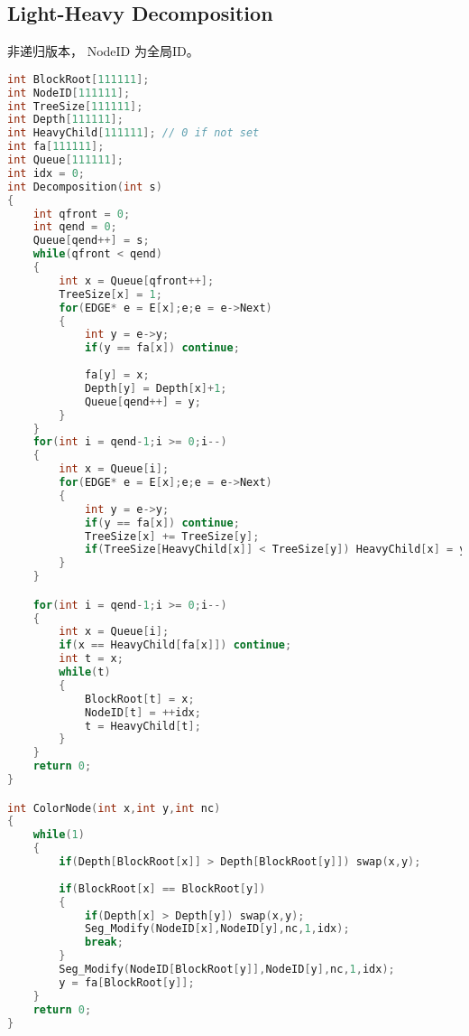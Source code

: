 \subsection{Light-Heavy Decomposition}
 非递归版本， NodeID 为全局ID。
\begin{lstlisting}[language=C++]
int BlockRoot[111111];
int NodeID[111111];
int TreeSize[111111];
int Depth[111111];
int HeavyChild[111111]; // 0 if not set
int fa[111111];
int Queue[111111];
int idx = 0;
int Decomposition(int s)
{
	int qfront = 0;
	int qend = 0;
	Queue[qend++] = s;
	while(qfront < qend)
	{
		int x = Queue[qfront++];
		TreeSize[x] = 1;
		for(EDGE* e = E[x];e;e = e->Next)
		{
			int y = e->y;
			if(y == fa[x]) continue;
			
			fa[y] = x;
			Depth[y] = Depth[x]+1;
			Queue[qend++] = y;
		}
	}
	for(int i = qend-1;i >= 0;i--)
	{
		int x = Queue[i];
		for(EDGE* e = E[x];e;e = e->Next)
		{
			int y = e->y;
			if(y == fa[x]) continue;
			TreeSize[x] += TreeSize[y];
			if(TreeSize[HeavyChild[x]] < TreeSize[y]) HeavyChild[x] = y;
		}
	}

	for(int i = qend-1;i >= 0;i--)
	{
		int x = Queue[i];
		if(x == HeavyChild[fa[x]]) continue;
		int t = x;
		while(t)
		{
			BlockRoot[t] = x;
			NodeID[t] = ++idx;
			t = HeavyChild[t];
		}
	}
	return 0;
}

int ColorNode(int x,int y,int nc)
{
    while(1)
    {
        if(Depth[BlockRoot[x]] > Depth[BlockRoot[y]]) swap(x,y);
         
        if(BlockRoot[x] == BlockRoot[y])
        {
            if(Depth[x] > Depth[y]) swap(x,y);
            Seg_Modify(NodeID[x],NodeID[y],nc,1,idx);
            break;
        }
        Seg_Modify(NodeID[BlockRoot[y]],NodeID[y],nc,1,idx);
        y = fa[BlockRoot[y]];
    }
    return 0;
}
\end{lstlisting}
